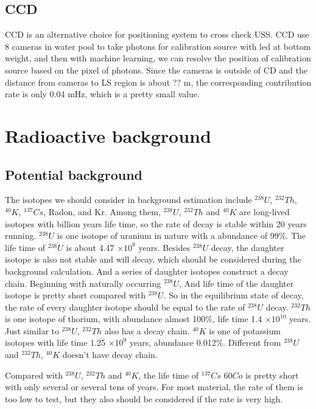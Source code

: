 \documentclass[review,number,sort&compress]{elsarticle}
\begin{document}
\subsection{CCD}
CCD is an alternative choice for positioning system to cross check USS.
CCD use 8 cameras in water pool to take photons for calibration source with led at bottom weight,
and then with machine learning, we can resolve the position of calibration source based on the pixel of photons.
Since the cameras is outside of CD and the distance from cameras to LS region is about ?? m, 
the corresponding contribution rate is only 0.04 mHz, which is a pretty small value.

\section{Radioactive background}
\subsection{Potential background}

The isotopes we should consider in background estimation include 
$^{238}U$, $^{232}Th$, $^{40}K$, $^{137}Cs$, Radon, and Kr.
Among them, $^{238}U$, $^{232}Th$ and $^{40}K$ are long-lived isotopes with billion years life time,
so the rate of decay is stable within 20 years running.
$^{238}U$ is one isotope of uranium in nature with a abundance of 99\%.
The life time of $^{238}U$ is about 4.47 $\times10^{9}$ years.
Besides $^{238}U$ decay, the daughter isotope is also not stable and will decay, 
which should be considered during the background calculation.
And a series of daughter isotopes construct a decay chain.
Beginning with naturally occurring $^{238}U$, 
And life time of the daughter isotope is pretty short compared with $^{238}U$.
So in the equilibrium state of decay, the rate of every daughter isotope should be equal to the rate of $^{238}U$ decay.
$^{232}Th$ is one isotope of thorium, with abundance almost 100\%, life time 1.4 $\times10^{10}$ years.
Just similar to $^{238}U$, $^{232}Th$ also has a decay chain.
$^{40}K$ is one of potassium isotopes with life time 1.25 $\times10^{9}$ years, abundance 0.012\%.
Different from $^{238}U$ and $^{232}Th$, $^{40}K$ doesn't have decay chain. 

Compared with $^{238}U$, $^{232}Th$ and $^{40}K$, 
the life time of $^{137}Cs$ ${60}Co$ is pretty short with only several or several tens of years. 
For most material, the rate of them is too low to test, but they also should be considered if the rate is very high.
\end{document}
